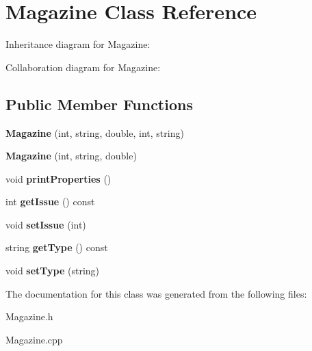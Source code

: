 \hypertarget{classMagazine}{}\section{Magazine Class Reference}
\label{classMagazine}


Inheritance diagram for Magazine\+:


Collaboration diagram for Magazine\+:
\subsection*{Public Member Functions}
\begin{DoxyCompactItemize}
\item 
{\bfseries Magazine} (int, string, double, int, string)\hypertarget{classMagazine_af32c7b2b56f8553579669f9f3200e2e7}{}\label{classMagazine_af32c7b2b56f8553579669f9f3200e2e7}

\item 
{\bfseries Magazine} (int, string, double)\hypertarget{classMagazine_ad79b115f747f89d5f1cebe268a94e0cb}{}\label{classMagazine_ad79b115f747f89d5f1cebe268a94e0cb}

\item 
void {\bfseries print\+Properties} ()\hypertarget{classMagazine_a64f61943072de7e5c608a52cf5ee86ac}{}\label{classMagazine_a64f61943072de7e5c608a52cf5ee86ac}

\item 
int {\bfseries get\+Issue} () const \hypertarget{classMagazine_a56cc90a6e371be7618d2aa90fe1661f6}{}\label{classMagazine_a56cc90a6e371be7618d2aa90fe1661f6}

\item 
void {\bfseries set\+Issue} (int)\hypertarget{classMagazine_a19df08bb3f6848601a04f03486d57099}{}\label{classMagazine_a19df08bb3f6848601a04f03486d57099}

\item 
string {\bfseries get\+Type} () const \hypertarget{classMagazine_add89716aed6ace7cbdd624497874e6b0}{}\label{classMagazine_add89716aed6ace7cbdd624497874e6b0}

\item 
void {\bfseries set\+Type} (string)\hypertarget{classMagazine_a29b2f7bd3ec5a76e9a5b0d06d64dec68}{}\label{classMagazine_a29b2f7bd3ec5a76e9a5b0d06d64dec68}

\end{DoxyCompactItemize}


The documentation for this class was generated from the following files\+:\begin{DoxyCompactItemize}
\item 
Magazine.\+h\item 
Magazine.\+cpp\end{DoxyCompactItemize}

